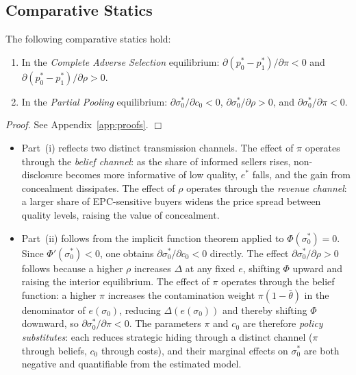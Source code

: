 \documentclass[10pt,letterpaper]{bp-template-concise}
\begin{document}
\subsection{Comparative Statics}

\begin{proposition}
\label{prop:comparative_statics}
The following comparative statics hold:
\begin{enumerate}[label=(\roman*)]
    \item In the \emph{Complete Adverse Selection} equilibrium: $\partial(p_0^*-p_1^*)/\partial\pi < 0$ and $\partial(p_0^*-p_1^*)/\partial\rho > 0$.
    \item In the \emph{Partial Pooling} equilibrium: $\partial\sigma_0^*/\partial c_0 < 0$, $\partial\sigma_0^*/\partial\rho > 0$, and $\partial\sigma_0^*/\partial\pi < 0$.
\end{enumerate}
\end{proposition}

\noindent\textit{Proof.} See Appendix~\ref{app:proofs}. $\Box$

\begin{itemize}
    \item Part~(i) reflects two distinct transmission channels. The effect of $\pi$ operates through the \textit{belief channel}: as the share of informed sellers rises, non-disclosure becomes more informative of low quality, $e^*$ falls, and the gain from concealment dissipates. The effect of $\rho$ operates through the \textit{revenue channel}: a larger share of EPC-sensitive buyers widens the price spread between quality levels, raising the value of concealment.
    \item Part~(ii) follows from the implicit function theorem applied to $\Phi(\sigma_0^*)=0$. Since $\Phi'(\sigma_0^*)<0$, one obtains $\partial\sigma_0^*/\partial c_0 < 0$ directly. The effect $\partial\sigma_0^*/\partial\rho > 0$ follows because a higher $\rho$ increases $\Delta$ at any fixed $e$, shifting $\Phi$ upward and raising the interior equilibrium. The effect of $\pi$ operates through the belief function: a higher $\pi$ increases the contamination weight $\pi(1-\bar{\theta})$ in the denominator of $e(\sigma_0)$, reducing $\Delta(e(\sigma_0))$ and thereby shifting $\Phi$ downward, so $\partial\sigma_0^*/\partial\pi < 0$. The parameters $\pi$ and $c_0$ are therefore \textit{policy substitutes}: each reduces strategic hiding through a distinct channel ($\pi$ through beliefs, $c_0$ through costs), and their marginal effects on $\sigma_0^*$ are both negative and quantifiable from the estimated model.
\end{itemize}
\end{document}
